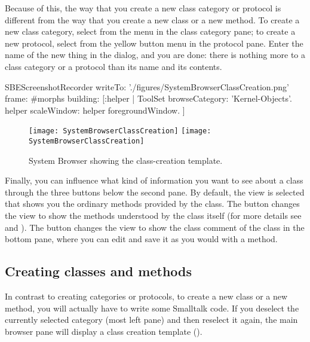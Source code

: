 \documentclass[a4paper,10pt,twoside]{book}
\begin{document}
Because of this, the way that you create a new class category or protocol is different from the way that you create a new class or a new method.
To create a new class category, select  from the  menu in the class category pane; to create a new protocol, select  from the yellow button menu in the protocol pane.
Enter the name of the new thing in the dialog, and you are done: there is nothing more to a class category or a protocol than its name and its contents.

\begin{ExecuteSmalltalkScript}
SBEScreenshotRecorder writeTo: './figures/SystemBrowserClassCreation.png' frame: #morphs building: [:helper |
	ToolSet browseCategory: 'Kernel-Objects'.
	helper scaleWindow: helper foregroundWindow.
]
\end{ExecuteSmalltalkScript}
\begin{figure}[htbp]
   \centering
   \ifluluelse
	   {\texttt{[image: SystemBrowserClassCreation]}}
	   {\texttt{[image: SystemBrowserClassCreation]}}
   \caption{System Browser showing the class-creation template.
   \label{fig:SystemBrowserClassCreation}}
\end{figure}

Finally, you can influence what kind of information you want to see about a class through the three buttons below the second pane.
By default, the  view is selected that shows you the ordinary methods provided by the class.
The  button changes the view to show the methods understood by the class itself (for more details see  and ).
The  button changes the view to show the class comment of the class in the bottom pane, where you can edit and save it as you would with a method.

\subsection{Creating classes and methods}
In contrast to creating categories or protocols, to create a new class or a new method, you will actually have to write some Smalltalk code.
If you deselect the currently selected category (most left pane) and then reselect it again, the main browser pane will display a class creation template ().
\end{document}
